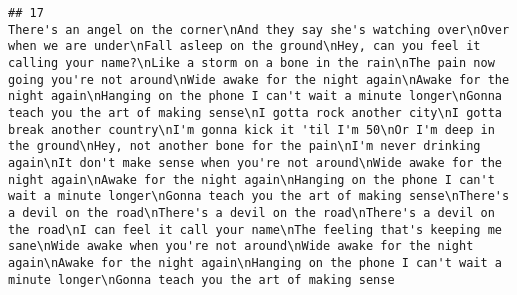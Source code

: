 \documentclass[]{article}
\begin{document}
\begin{verbatim}
## 17                                                                                                                                                                                                                                                                                                                                                                                                                                                                                                                                                                                                                                                                                                                                                                                                                                                                                                                                                                                                                                                                                                                                                                                                                                                                                                                                                                                                                                                                                                                                                                                                                                                                                                                                                                                                                                                                                                                                                                                                     There's an angel on the corner\nAnd they say she's watching over\nOver when we are under\nFall asleep on the ground\nHey, can you feel it calling your name?\nLike a storm on a bone in the rain\nThe pain now going you're not around\nWide awake for the night again\nAwake for the night again\nHanging on the phone I can't wait a minute longer\nGonna teach you the art of making sense\nI gotta rock another city\nI gotta break another country\nI'm gonna kick it 'til I'm 50\nOr I'm deep in the ground\nHey, not another bone for the pain\nI'm never drinking again\nIt don't make sense when you're not around\nWide awake for the night again\nAwake for the night again\nHanging on the phone I can't wait a minute longer\nGonna teach you the art of making sense\nThere's a devil on the road\nThere's a devil on the road\nThere's a devil on the road\nI can feel it call your name\nThe feeling that's keeping me sane\nWide awake when you're not around\nWide awake for the night again\nAwake for the night again\nHanging on the phone I can't wait a minute longer\nGonna teach you the art of making sense

\end{verbatim}
\end{document}
